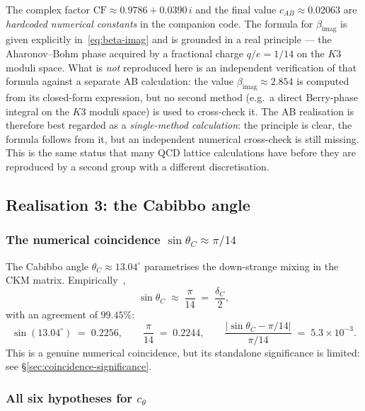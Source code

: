 \documentclass[11pt,a4paper]{article}
\newcommand{\dC}{\delta_C}
\theoremstyle{plain}
\theoremstyle{definition}
\theoremstyle{remark}
\begin{document}
\begin{caveat}
The complex factor $\mathrm{CF} \approx 0.9786 + 0.0390\,i$ and the
final value $c_{AB} \approx 0.02063$ are \emph{hardcoded numerical
constants} in the companion code.  The formula for
$\beta_{\mathrm{imag}}$ is given explicitly in~\eqref{eq:beta-imag}
and is grounded in a real principle --- the Aharonov--Bohm phase
acquired by a fractional charge $q/e = 1/14$ on the $K3$ moduli
space.  What is \emph{not} reproduced here is an independent
verification of that formula against a separate AB calculation:
the value $\beta_{\mathrm{imag}} \approx 2.854$ is computed from
its closed-form expression, but no second method (e.g.\ a direct
Berry-phase integral on the $K3$ moduli space) is used to
cross-check it.  The AB realisation is therefore best regarded as
a \emph{single-method calculation}: the principle is clear, the
formula follows from it, but an independent numerical cross-check
is still missing.  This is the same status that many QCD lattice
calculations have before they are reproduced by a second group
with a different discretisation.
\end{caveat}

\subsection{Realisation 3: the Cabibbo angle}
\label{ssec:cabibbo}
\label{ssec:cabibbo-honest}

\subsubsection{The numerical coincidence $\sin\theta_C \approx \pi/14$}

The Cabibbo angle $\theta_C \approx 13.04^\circ$ parametrises the
down-strange mixing in the CKM matrix.  Empirically~\cite{cabibbo1963,
wolfenstein1983},
\begin{equation}\label{eq:cabibbo-coincidence}
  \sin\theta_C \;\approx\; \frac{\pi}{14} \;=\; \frac{\dC}{2},
\end{equation}
with an agreement of $99.45\%$:
\[
  \sin(13.04^\circ) \;=\; 0.2256, \qquad
  \frac{\pi}{14} \;=\; 0.2244, \qquad
  \frac{|\sin\theta_C - \pi/14|}{\pi/14} \;=\; 5.3\times 10^{-3}.
\]
This is a genuine numerical coincidence, but its standalone
significance is limited: see \S\ref{sec:coincidence-significance}.

\subsubsection{All six hypotheses for $c_\theta$}
\end{document}

